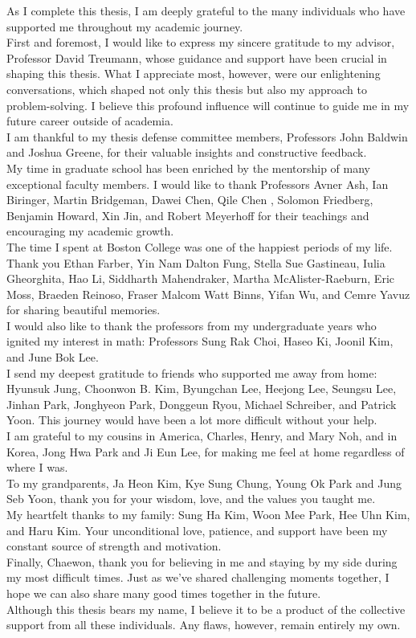 As I complete this thesis, I am deeply grateful to the many individuals who have supported me throughout my academic journey.\\
First and foremost, I would like to express my sincere gratitude to my advisor, Professor David Treumann, whose guidance and support have been crucial in shaping this thesis. What I appreciate most, however, were our enlightening conversations, which shaped not only this thesis but also my approach to problem-solving. I believe this profound influence will continue to guide me in my future career outside of academia.\\
I am thankful to my thesis defense committee members, Professors John Baldwin and Joshua Greene, for their valuable insights and constructive feedback.\\
My time in graduate school has been enriched by the mentorship of many exceptional faculty members. I would like to thank Professors Avner Ash, Ian Biringer, Martin Bridgeman, Dawei Chen, Qile Chen , Solomon Friedberg, Benjamin Howard, Xin Jin, and Robert Meyerhoff for their teachings and encouraging my academic growth.\\
The time I spent at Boston College was one of the happiest periods of my life. Thank you Ethan Farber, Yin Nam Dalton Fung, Stella Sue Gastineau, Iulia Gheorghita, Hao Li, Siddharth Mahendraker, Martha McAlister-Raeburn, Eric Moss, Braeden Reinoso, Fraser Malcom Watt Binns, Yifan Wu, and Cemre Yavuz for sharing beautiful memories.\\
I would also like to thank the professors from my undergraduate years who ignited my interest in math: Professors Sung Rak Choi, Haseo Ki, Joonil Kim, and June Bok Lee.\\
I send my deepest gratitude to friends who supported me away from home: Hyunsuk Jung, Choonwon B. Kim, Byungchan Lee, Heejong Lee, Seungsu Lee, Jinhan Park, Jonghyeon Park, Donggeun Ryou, Michael Schreiber, and Patrick Yoon. This journey would have been a lot more difficult without your help.\\
I am grateful to my cousins in America, Charles, Henry, and Mary Noh, and in Korea, Jong Hwa Park and Ji Eun Lee, for making me feel at home regardless of where I was.\\
To my grandparents, Ja Heon Kim, Kye Sung Chung, Young Ok Park and Jung Seb Yoon, thank you for your wisdom, love, and the values you taught me.\\
My heartfelt thanks to my family: Sung Ha Kim, Woon Mee Park, Hee Uhn Kim, and Haru Kim. Your unconditional love, patience, and support have been my constant source of strength and motivation.\\
Finally, Chaewon, thank you for believing in me and staying by my side during my most difficult times. Just as we've shared challenging moments together, I hope we can also share many good times together in the future.\\
Although this thesis bears my name, I believe it to be a product of the collective support from all these individuals. Any flaws, however, remain entirely my own.


